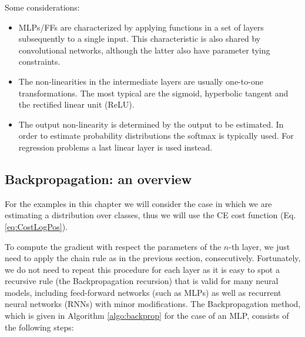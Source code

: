 \noindent Some considerations:
%
\begin{itemize}
\item MLPs/FFs are characterized by applying functions in a set of layers subsequently to a single input. This characteristic is also shared by convolutional networks, although the latter also have parameter tying constraints.
\item The non-linearities in the intermediate layers are usually one-to-one transformations. The most typical are the sigmoid, hyperbolic tangent and the rectified linear unit (ReLU). 
\item The output non-linearity is determined by the output to be estimated. In order to estimate probability distributions the softmax is typically used. For regression problems a last linear layer is used instead.
\end{itemize}

\subsection{Backpropagation: an overview}

For the examples in this chapter we will consider the case in which we are estimating a distribution over classes, thus we will use the CE cost function (Eq. \ref{eq:CostLogPos}). 


To compute the gradient with respect the parameters of the $n$-th layer, we
just need to apply the chain rule as in the previous section, consecutively.
Fortunately, we do not need to repeat this procedure for each layer as it is
easy to spot a recursive rule (the Backpropagation recursion) that is valid
for many neural models, including feed-forward networks (such as MLPs) as well
as recurrent neural networks (RNNs) with minor modifications. The
Backpropagation method, which is given in Algorithm \ref{algo:backprop} for
the case of an MLP, consists of the following steps:

